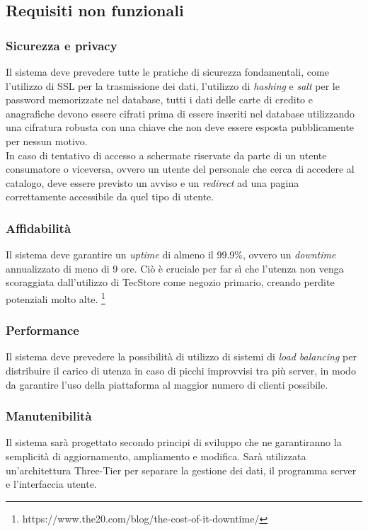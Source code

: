 \documentclass[12pt]{article}
\begin{document}
\newpage


\subsection{Requisiti non funzionali}
\subsubsection{Sicurezza e privacy}
Il sistema deve prevedere tutte le pratiche di sicurezza fondamentali, come l'utilizzo di SSL per la trasmissione dei dati, l'utilizzo di \textit{hashing} e \textit{salt} per le password memorizzate nel database, tutti i dati delle carte di credito e anagrafiche devono essere cifrati prima di essere inseriti nel database utilizzando una cifratura robusta con una chiave che non deve essere esposta pubblicamente per nessun motivo. \\
In caso di tentativo di accesso a schermate riservate da parte di un utente consumatore o viceversa, ovvero un utente del personale che cerca di accedere al catalogo, deve essere previsto un avviso e un \textit{redirect} ad una pagina correttamente accessibile da quel tipo di utente.

\subsubsection{Affidabilità}
Il sistema deve garantire un \emph{uptime} di almeno il 99.9\%, ovvero un \textit{downtime} annualizzato di meno di 9 ore. Ciò è cruciale per far sì che l'utenza non venga scoraggiata dall'utilizzo di TecStore come negozio primario, creando perdite potenziali molto alte. \footnote{https://www.the20.com/blog/the-cost-of-it-downtime/}

\subsubsection{Performance}
Il sistema deve prevedere la possibilità di utilizzo di sistemi di \textit{load balancing} per distribuire il carico di utenza in caso di picchi improvvisi tra più server, in modo da garantire l'uso della piattaforma al maggior numero di clienti possibile.

\subsubsection{Manutenibilità}
Il sistema sarà progettato secondo principi di sviluppo che ne garantiranno la semplicità di aggiornamento, ampliamento e modifica.
Sarà utilizzata un'architettura Three-Tier per separare la gestione dei dati, il programma server e l'interfaccia utente.
\end{document}
